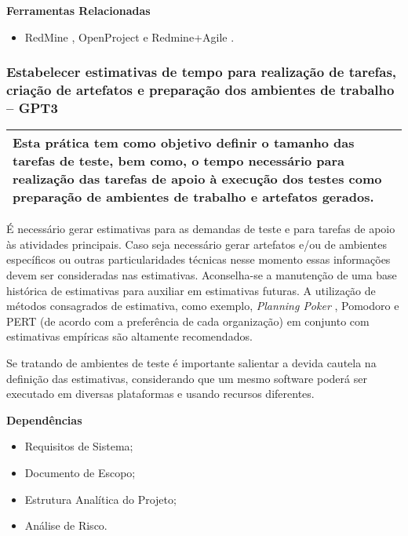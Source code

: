 \textbf{Ferramentas Relacionadas}
\begin{itemize}
    \item RedMine \cite{Redmine}, OpenProject \cite{OpenProject} e Redmine+Agile \cite{RedmineUP}.
\end{itemize}

\subsubsection{Estabelecer estimativas de tempo para realização de tarefas, criação de artefatos e preparação dos ambientes de trabalho – GPT3}
\label{sec:gpt3}

\begin{table}[H]
\centering
\begin{tabular}{|p{130mm}|}
\hline
Esta prática tem como objetivo definir o tamanho das tarefas de teste, bem como, o tempo necessário para realização das tarefas de apoio à execução dos testes como preparação de ambientes de trabalho e artefatos gerados. \\ 
\hline
\end{tabular}
\end{table}

É necessário gerar estimativas para as demandas de teste e para tarefas de apoio às atividades principais. Caso seja necessário gerar artefatos e/ou de ambientes específicos ou outras particularidades técnicas nesse momento essas informações devem ser consideradas nas estimativas. Aconselha-se a manutenção de uma base histórica de estimativas para auxiliar em estimativas futuras. A utilização de métodos consagrados de estimativa, como exemplo, \textit{Planning Poker} \cite{Cohn2005}, Pomodoro \cite{Pomodoro2014} e PERT \cite{Pert1998} (de acordo com a preferência de cada organização) em conjunto com estimativas empíricas são altamente recomendados.

Se tratando de ambientes de teste é importante salientar a devida cautela na definição das estimativas, considerando que um mesmo software poderá ser executado em diversas plataformas e usando recursos diferentes. 

\textbf{Dependências}
\begin{itemize}
    \item Requisitos de Sistema;
    \item Documento de Escopo;
    \item Estrutura Analítica do Projeto;
    \item Análise de Risco.
\end{itemize}


